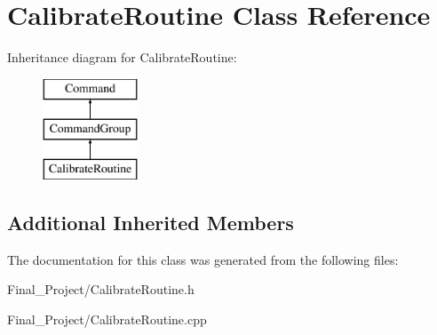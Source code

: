 \hypertarget{classCalibrateRoutine}{\section{Calibrate\-Routine Class Reference}
\label{classCalibrateRoutine}
}
Inheritance diagram for Calibrate\-Routine\-:\begin{figure}[H]
\begin{center}
\leavevmode
\includegraphics[height=3.000000cm]{classCalibrateRoutine}
\end{center}
\end{figure}
\subsection*{Additional Inherited Members}


The documentation for this class was generated from the following files\-:\begin{DoxyCompactItemize}
\item 
Final\-\_\-\-Project/Calibrate\-Routine.\-h\item 
Final\-\_\-\-Project/Calibrate\-Routine.\-cpp\end{DoxyCompactItemize}

